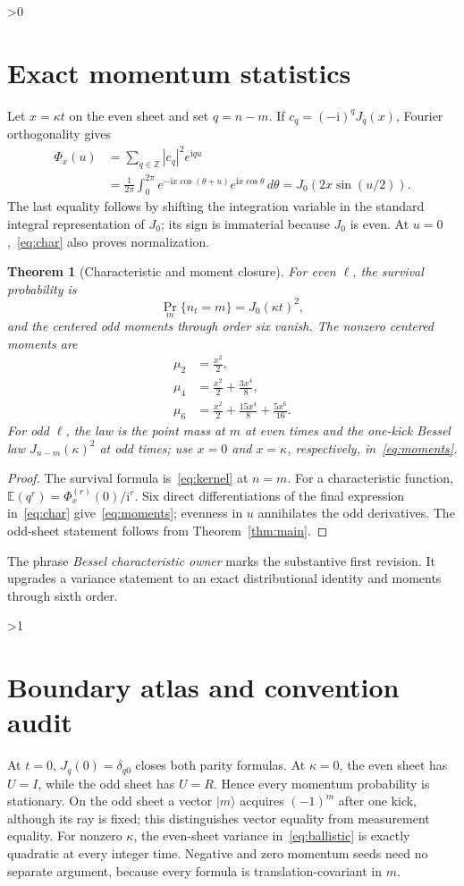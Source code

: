 \documentclass[10pt]{article}
\providecommand{\CRevisionRound}{2}
\newtheorem{theorem}{Theorem}
\newcommand{\ZZ}{\mathbb Z}
\newcommand{\EE}{\mathbb E}
\newcommand{\ii}{\mathrm i}
\begin{document}
\ifnum\CRevisionRound>0
\section{Exact momentum statistics}
Let $x=\kappa t$ on the even sheet and set $q=n-m$.  If
$c_q=(-\ii)^qJ_q(x)$, Fourier orthogonality gives
\begin{align}
 \Phi_x(u)
 &=\sum_{q\in\ZZ}|c_q|^2e^{\ii qu}\label{eq:char}\\
 &=\frac1{2\pi}\int_0^{2\pi}
 e^{-\ii x\cos(\theta+u)}e^{\ii x\cos\theta}\,d\theta
 =J_0\!(2x\sin(u/2)).\nonumber
\end{align}
The last equality follows by shifting the integration variable in the
standard integral representation of $J_0$; its sign is immaterial because
$J_0$ is even.  At $u=0$,~\eqref{eq:char} also proves normalization.

\begin{theorem}[Characteristic and moment closure]\label{thm:moments}
For even $\ell$, the survival probability is
\[
 \Pr_m\{n_t=m\}=J_0(\kappa t)^2,
\]
and the centered odd moments through order six vanish.  The nonzero centered
moments are
\begin{align}
 \mu_2&=\frac{x^2}{2},\label{eq:moments}\\
 \mu_4&=\frac{x^2}{2}+\frac{3x^4}{8},\nonumber\\
 \mu_6&=\frac{x^2}{2}+\frac{15x^4}{8}+\frac{5x^6}{16}.\nonumber
\end{align}
For odd $\ell$, the law is the point mass at $m$ at even times and the
one-kick Bessel law $J_{n-m}(\kappa)^2$ at odd times; use $x=0$ and
$x=\kappa$, respectively, in~\eqref{eq:moments}.
\end{theorem}

\begin{proof}
The survival formula is~\eqref{eq:kernel} at $n=m$.  For a characteristic
function, $\EE(q^r)=\Phi_x^{(r)}(0)/\ii^r$.  Six direct differentiations of
the final expression in~\eqref{eq:char} give~\eqref{eq:moments}; evenness in
$u$ annihilates the odd derivatives.  The odd-sheet statement follows from
Theorem~\ref{thm:main}.
\end{proof}

The phrase \emph{Bessel characteristic owner} marks the substantive first
revision.  It upgrades a variance statement to an exact distributional
identity and moments through sixth order.
\fi

\ifnum\CRevisionRound>1
\section{Boundary atlas and convention audit}
At $t=0$, $J_q(0)=\delta_{q0}$ closes both parity formulas.  At $\kappa=0$,
the even sheet has $U=I$, while the odd sheet has $U=R$.  Hence every
momentum probability is stationary.  On the odd sheet a vector $|m\rangle$
acquires $(-1)^m$ after one kick, although its ray is fixed; this distinguishes
vector equality from measurement equality.  For nonzero $\kappa$, the
even-sheet variance in~\eqref{eq:ballistic} is exactly quadratic at every
integer time.  Negative and zero momentum seeds need no separate argument,
because every formula is translation-covariant in $m$.
\end{document}
